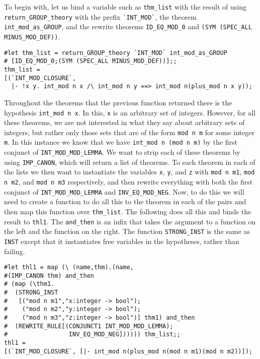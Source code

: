 To begin with, let us bind a variable such as {\small\verb+thm_list+}
with the result of using {\small\verb+return_GROUP_theory+} with the
prefix {\small\verb+`INT_MOD`+}, the theorem
{\small\verb+int_mod_as_GROUP+}, and the rewrite theorems
{\small\verb+ID_EQ_MOD_0+} and {\small\verb+(SYM (SPEC_ALL MINUS_MOD_DEF))+}.
\begin{session}
\begin{verbatim}
#let thm_list = return_GROUP_theory `INT_MOD` int_mod_as_GROUP
# [ID_EQ_MOD_0;(SYM (SPEC_ALL MINUS_MOD_DEF))];;
thm_list = 
[(`INT_MOD_CLOSURE`,
  |- !x y. int_mod n x /\ int_mod n y ==> int_mod n(plus_mod n x y));
\end{verbatim}
\evdots
\end{session}

Throughout the theorems that the previous function returned there
is the hypothesis {\small\verb+int_mod n x+}.  In this, {\small\tt x}
is an arbitrary set of integers.  However, for all these theorems, we
are not interested in what they say about arbitrary sets of integers,
but rather only those sets that are of the form {\small\verb+mod n m+}
for some integer {\small\tt m}.  In this instance we know that we have
{\small\verb+int_mod n (mod n m)+} by the first conjunct of
{\small\verb+INT_MOD_MOD_LEMMA+}.  We want to strip each of these
theorems by using {\small\verb+IMP_CANON+}, which will return a list
of theorems.  To each theorem in each of the lists we then want to
instantiate the variables {\small\tt x}, {\small\tt y}, and
{\small\tt z} with {\small\verb+mod n m1+}, {\small\verb+mod n m2+},
and {\small\verb+mod n m3+} respectively, and then rewrite everything
with both the first conjunct of {\small\verb+INT_MOD_MOD_LEMMA+} and
{\small\verb+INV_EQ_MOD_NEG+}.  Now, to do this we will need to create
a function to do all this to the theorem in each of the pairs and then
map this function over {\small\verb+thm_list+}.  The following does
all this and binds the result to {\small\verb+thl1+}. The
{\small\verb+and_then+} is an infix that takes the argument to a
function on the left and the function on the right.  The function
{\small\verb+STRONG_INST+} is the same as {\small\verb+INST+} except that it
instantiates free variables in the hypotheses, rather than failing.
\begin{session}
\begin{verbatim}
#let thl1 = map (\ (name,thm).(name,
#(IMP_CANON thm) and_then
# (map (\thm1.
#  (STRONG_INST
#   [("mod n m1","x:integer -> bool");
#    ("mod n m2","y:integer -> bool");
#    ("mod n m3","z:integer -> bool")] thm1) and_then
#  (REWRITE_RULE[(CONJUNCT1 INT_MOD_MOD_LEMMA);
#                 INV_EQ_MOD_NEG]))))) thm_list;;
thl1 = 
[(`INT_MOD_CLOSURE`, [|- int_mod n(plus_mod n(mod n m1)(mod n m2))]);
\end{verbatim}
\evdots
\end{session}

